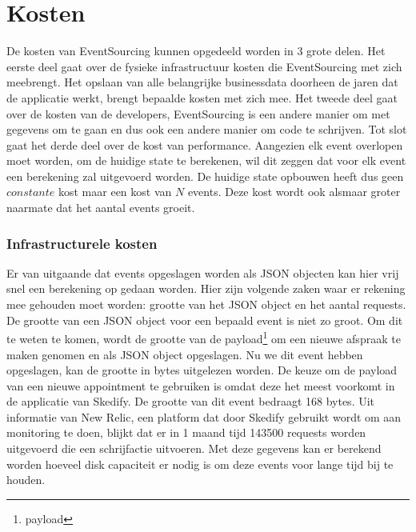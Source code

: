 
\chapter{Kosten}
\label{ch:kosten}

De kosten van EventSourcing kunnen opgedeeld worden in 3 grote delen. Het eerste deel gaat over de fysieke infrastructuur kosten die EventSourcing met zich meebrengt. Het opslaan van alle belangrijke businessdata doorheen de jaren dat de applicatie werkt, brengt bepaalde kosten met zich mee. Het tweede deel gaat over de kosten van de developers, EventSourcing is een andere manier om met gegevens om te gaan en dus ook een andere manier om code te schrijven. Tot slot gaat het derde deel over de kost van performance. Aangezien elk event overlopen moet worden, om de huidige \gls{state} te berekenen, wil dit zeggen dat voor elk event een berekening zal uitgevoerd worden. De huidige \gls{state} opbouwen heeft dus geen $constante$ kost maar een kost van $N$ events. Deze kost wordt ook alsmaar groter naarmate dat het aantal events groeit.

\subsection{Infrastructurele kosten}
\label{subsec:infrastructurele-kosten}

Er van uitgaande dat events opgeslagen worden als \gls{JSON} objecten kan hier vrij snel een berekening op gedaan worden. Hier zijn volgende zaken waar er rekening mee gehouden moet worden: grootte van het \gls{JSON} object en het aantal \glspl{request}.
De grootte van een \gls{JSON} object voor een bepaald event is niet zo groot. Om dit te weten te komen, wordt de grootte van de \gls{payload}\footnote{\glsdesc{payload}} om een nieuwe afspraak te maken genomen en als \gls{JSON} object opgeslagen. Nu we dit event hebben opgeslagen, kan de grootte in bytes uitgelezen worden. De keuze om de payload van een nieuwe appointment te gebruiken is omdat deze het meest voorkomt in de applicatie van Skedify. De grootte van dit event bedraagt 168 bytes.
Uit informatie van New Relic, een platform dat door Skedify gebruikt wordt om aan monitoring te doen, blijkt dat er in 1 maand tijd 143500 \glspl{request} worden uitgevoerd die een schrijfactie uitvoeren.
Met deze gegevens kan er berekend worden hoeveel disk capaciteit er nodig is om deze events voor lange tijd bij te houden.

